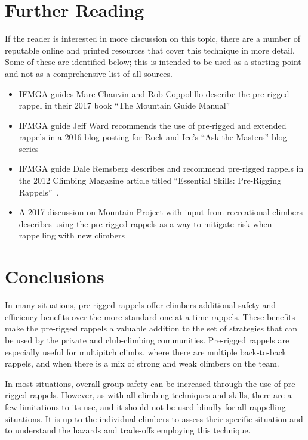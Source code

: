 \documentclass[nonacm,acmtog]{acmart}
\begin{document}
\section{Further Reading}
\label{sec:reading}

If the reader is interested in more discussion on this topic, there are a
number of reputable online and printed resources that cover this technique in
more detail.  Some of these are identified below; this is intended to be used
as a starting point and not as a comprehensive list of all sources.

\begin{itemize}
\item IFMGA guides Marc Chauvin and Rob Coppolillo describe the pre-rigged
   rappel in their 2017 book ``The Mountain Guide Manual'' \cite[pp. 182-183]{mgm}
\item IFMGA guide Jeff Ward recommends the use of pre-rigged and extended
   rappels in a 2016 blog posting for Rock and Ice's ``Ask the Masters'' blog
   series~\cite{www:ri-askthemaster-prerigged}
\item IFMGA guide Dale Remsberg describes and recommend pre-rigged rappels in
   the 2012 Climbing Magazine article titled ``Essential Skills: Pre-Rigging
   Rappels''~\cite{www:climbing-prerigged}.
\item A 2017 discussion on Mountain Project with input from recreational
   climbers describes using the pre-rigged rappels as a way to mitigate risk
   when rappelling with new climbers~\cite{www:mp-prerigged}
\end{itemize}

\section{Conclusions}
\label{sec:conclusion}

  In many situations, pre-rigged rappels offer climbers additional safety and
  efficiency benefits over the more standard one-at-a-time rappels.  These
  benefits make the pre-rigged rappels a valuable addition to the set of
  strategies that can be used by the private and club-climbing communities.
  Pre-rigged rappels are especially useful for multipitch climbs, where there
  are multiple back-to-back rappels, and when there is a mix of strong and weak
  climbers on the team.

  In most situations, overall group safety can be increased through the use of
  pre-rigged rappels.  However, as with all climbing techniques and skills,
  there are a few limitations to its use, and it should not be used blindly for
  all rappelling situations.  It is up to the individual climbers to assess
  their specific situation and to understand the hazards and trade-offs
  employing this technique.



\end{document}
